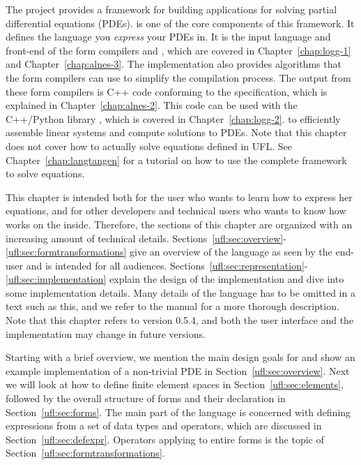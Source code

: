 The \fenics{} project provides a framework for building applications
for solving partial differential equations (PDEs).  \ufl{} is one of
the core components of this framework.  It defines the language you
\emph{express} your PDEs in.  It is the input language and front-end
of the form compilers \ffc{} and \sfc{}, which are covered in
Chapter~\ref{chap:logg-1} and Chapter~\ref{chap:alnes-3}.  The \ufl{}
implementation also provides algorithms that the form compilers can use to
simplify the compilation process.  The output from these form compilers is
C++ \citep{Stroustrup1997} code conforming to the \ufc{} specification,
which is explained in Chapter~\ref{chap:alnes-2}.  This code can be used
with the C++/Python library \dolfin{}, which is covered in Chapter~\ref{chap:logg-2}.
to efficiently assemble linear systems and compute solutions to PDEs.
Note that this chapter does not cover how to actually solve equations
defined in UFL. See Chapter~\ref{chap:langtangen} for a tutorial on how
to use the complete \fenics{} framework to solve equations.

This chapter is intended both for the \fenics{} user who wants
to learn how to express her equations, and for other \fenics{}
developers and technical users who wants to know how \ufl{}
works on the inside.  Therefore, the sections of this chapter
are organized with an increasing amount of technical details.
Sections~\ref{ufl:sec:overview}-\ref{ufl:sec:formtransformations}
give an overview of the language as seen by
the end-user and is intended for all audiences.
Sections~\ref{ufl:sec:representation}-\ref{ufl:sec:implementation}
explain the design of the implementation and dive into some implementation
details.  Many details of the language has to be omitted in a text such
as this, and we refer to the \ufl{} manual \citep{AlnaesA.Logg2009} for
a more thorough description. Note that this chapter refers to \ufl{}
version 0.5.4, and both the user interface and the implementation may
change in future versions.

Starting with a brief overview, we mention the main design goals
for \ufl{} and show an example implementation of a non-trivial
PDE in Section~\ref{ufl:sec:overview}.  Next we will look at how
to define finite element spaces in Section~\ref{ufl:sec:elements},
followed by the overall structure of forms and their declaration in
Section~\ref{ufl:sec:forms}.  The main part of the language is concerned
with defining expressions from a set of data types and operators, which
are discussed in Section~\ref{ufl:sec:defexpr}.  Operators applying to
entire forms is the topic of Section~\ref{ufl:sec:formtransformations}.

